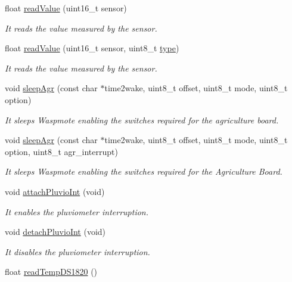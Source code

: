 \begin{DoxyCompactItemize}
float \hyperlink{class_wasp_sensor_agr__v20_a72afa154e74b7b7b6b86744b50068be5}{read\+Value} (uint16\+\_\+t sensor)
\begin{DoxyCompactList}\small\item\em It reads the value measured by the sensor. \end{DoxyCompactList}\item 
float \hyperlink{class_wasp_sensor_agr__v20_ad8f7e3cac864da7316cfa6842ffe479f}{read\+Value} (uint16\+\_\+t sensor, uint8\+\_\+t \hyperlink{_sd_fat_structs_8h_a1d127017fb298b889f4ba24752d08b8e}{type})
\begin{DoxyCompactList}\small\item\em It reads the value measured by the sensor. \end{DoxyCompactList}\item 
void \hyperlink{class_wasp_sensor_agr__v20_a6595e0f4b1597a4db1eb33b4dc11196e}{sleep\+Agr} (const char $\ast$time2wake, uint8\+\_\+t offset, uint8\+\_\+t mode, uint8\+\_\+t option)
\begin{DoxyCompactList}\small\item\em It sleeps Waspmote enabling the switches required for the agriculture board. \end{DoxyCompactList}\item 
void \hyperlink{class_wasp_sensor_agr__v20_a87a07f94ed9a4405c1c7d5c00c6b45ef}{sleep\+Agr} (const char $\ast$time2wake, uint8\+\_\+t offset, uint8\+\_\+t mode, uint8\+\_\+t option, uint8\+\_\+t agr\+\_\+interrupt)
\begin{DoxyCompactList}\small\item\em It sleeps Waspmote enabling the switches required for the Agriculture Board. \end{DoxyCompactList}\item 
void \hyperlink{class_wasp_sensor_agr__v20_ae9823bddb58a6c02601729cd6434003d}{attach\+Pluvio\+Int} (void)
\begin{DoxyCompactList}\small\item\em It enables the pluviometer interruption. \end{DoxyCompactList}\item 
void \hyperlink{class_wasp_sensor_agr__v20_a944a303d03de153bc98161bde8749dab}{detach\+Pluvio\+Int} (void)
\begin{DoxyCompactList}\small\item\em It disables the pluviometer interruption. \end{DoxyCompactList}\item 
float \hyperlink{class_wasp_sensor_agr__v20_a84aa330550873af1cda374219c28d465}{read\+Temp\+D\+S1820} ()

\end{DoxyCompactItemize}
